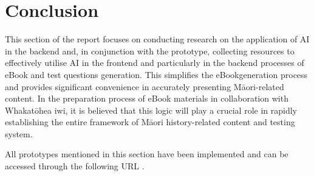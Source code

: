 \section{Conclusion}
This section of the report focuses on conducting research on the application of AI in the backend and, in conjunction with the prototype, collecting resources to effectively utilise AI in the frontend and particularly in the backend processes of eBook and test questions generation. 
This simplifies the eBookgeneration process and provides significant convenience in accurately presenting Māori-related content. 
In the preparation process of eBook materials in collaboration with Whakatōhea iwi, it is believed that this logic will play a crucial role in rapidly establishing the entire framework of Māori history-related content and testing system.

All prototypes mentioned in this section have been implemented and can be accessed through the following URL \autocite{Page1wh37:online}.